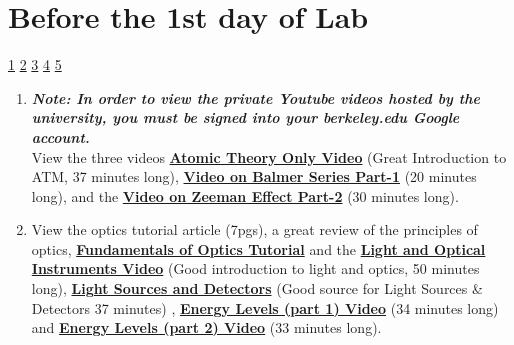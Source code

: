 \documentclass{../lab}
\begin{document}
\section{Before the 1st day of Lab}

\signatures \hyperlink{Preparation}{ 1} \hyperlink{Peak Finding}{ 2} \hyperlink{Additional Questions}{ 3} \hyperlink{Zeeman Picture}{ 4} \hyperlink{Zeeman Splitting}{ 5}

\begin{enumerate}
    \item \emph{\textbf{Note: In order to view the private Youtube videos hosted by the university, you must be signed into your berkeley.edu Google account.}} \\
    View the three videos \href{http://youtu.be/iJ\_4ygOaE7A}{\textbf{Atomic Theory Only Video}} (Great Introduction to ATM, 37 minutes long), \href{http://youtu.be/M41IKkUAG-A}{\textbf{Video on Balmer Series Part-1}} (20 minutes long), and the \href{http://youtu.be/-l2chO5SLew}{\textbf{Video on Zeeman Effect Part-2}} (30 minutes long).



    \item View the optics tutorial article (7pgs), a great review of the principles of optics, \href{http://experimentationlab.berkeley.edu/sites/default/files/QIE/fundamental-Optics.pdf}{\textbf{Fundamentals of Optics Tutorial}}\textbf{ }and the \href{http://youtu.be/zUGBt5vc5FA}{\textbf{Light and Optical Instruments Video}}\textbf{ }(Good introduction to light and optics, 50 minutes long), \href{http://youtu.be/lQKLakISoBA}{\textbf{Light Sources and Detectors}} (Good source for Light Sources \& Detectors 37 minutes) , \href{http://youtu.be/wyBOVjU5bBQ}{\textbf{Energy Levels (part 1) Video}} (34 minutes long) and \href{http://youtu.be/Eypw0DmVBxk}{\textbf{Energy Levels (part 2) Video}} (33 minutes long).


\end{enumerate}
\end{document}
